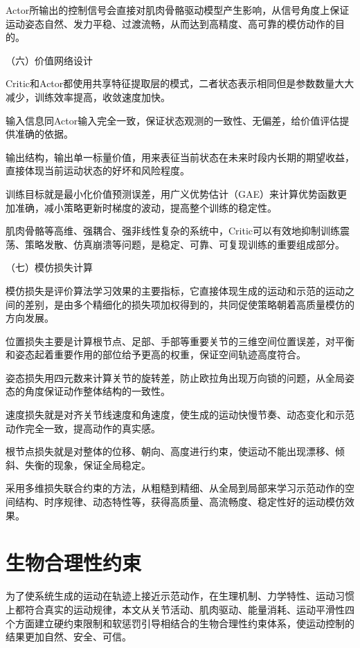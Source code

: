 Actor所输出的控制信号会直接对肌肉骨骼驱动模型产生影响，从信号角度上保证运动姿态自然、发力平稳、过渡流畅，从而达到高精度、高可靠的模仿动作的目的。

（六）价值网络设计

Critic和Actor都使用共享特征提取层的模式，二者状态表示相同但是参数数量大大减少，训练效率提高，收敛速度加快。

输入信息同Actor输入完全一致，保证状态观测的一致性、无偏差，给价值评估提供准确的依据。

输出结构，输出单一标量价值，用来表征当前状态在未来时段内长期的期望收益，直接体现当前运动状态的好坏和风险程度。

训练目标就是最小化价值预测误差，用广义优势估计（GAE）来计算优势函数更加准确，减小策略更新时梯度的波动，提高整个训练的稳定性。

肌肉骨骼等高维、强耦合、强非线性复杂的系统中，Critic可以有效地抑制训练震荡、策略发散、仿真崩溃等问题，是稳定、可靠、可复现训练的重要组成部分。

（七）模仿损失计算

模仿损失是评价算法学习效果的主要指标，它直接体现生成的运动和示范的运动之间的差别，是由多个精细化的损失项加权得到的，共同促使策略朝着高质量模仿的方向发展。

位置损失主要是计算根节点、足部、手部等重要关节的三维空间位置误差，对平衡和姿态起着重要作用的部位给予更高的权重，保证空间轨迹高度符合。

姿态损失用四元数来计算关节的旋转差，防止欧拉角出现万向锁的问题，从全局姿态的角度保证动作整体结构的一致性。

速度损失就是对齐关节线速度和角速度，使生成的运动快慢节奏、动态变化和示范动作完全一致，提高动作的真实感。

根节点损失就是对整体的位移、朝向、高度进行约束，使运动不能出现漂移、倾斜、失衡的现象，保证全局稳定。

采用多维损失联合约束的方法，从粗糙到精细、从全局到局部来学习示范动作的空间结构、时序规律、动态特性等，获得高质量、高流畅度、稳定性好的运动模仿效果。

\section{生物合理性约束}\label{ux751fux7269ux5408ux7406ux6027ux7ea6ux675f}

为了使系统生成的运动在轨迹上接近示范动作，在生理机制、力学特性、运动习惯上都符合真实的运动规律，本文从关节活动、肌肉驱动、能量消耗、运动平滑性四个方面建立硬约束限制和软惩罚引导相结合的生物合理性约束体系，使运动控制的结果更加自然、安全、可信。

